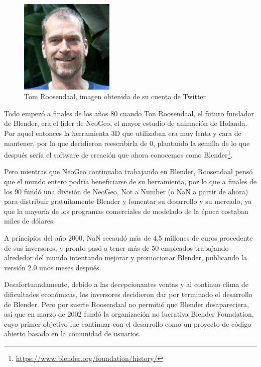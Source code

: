 \begin{figure}[!h]
\begin{center}
\includegraphics[width=0.4\textwidth]{imagenes/2/roosendaal.jpg}
\caption{Tom Roosendaal, imagen obtenida de su cuenta de Twitter}
\label{fig:roosendaal}
\end{center}
\end{figure}

Todo empezó a finales de los años 80 cuando Ton Roosendaal, el futuro fundador de Blender, era el líder de NeoGeo, el mayor estudio de animación de Holanda. Por aquel entonces la herramienta 3D que utilizaban era muy lenta y cara de mantener, por lo que decidieron reescribirla de 0, plantando la semilla de lo que después sería el software de creación que ahora conocemos como Blender\footnote{\url{https://www.blender.org/foundation/history/}}. 

Pero mientras que NeoGeo continuaba trabajando en Blender, Roosendaal pensó que el mundo entero podría beneficiarse de su herramienta, por lo que a finales de los 90 fundó una división de NeoGeo, Not a Number (o NaN a partir de ahora) para distribuir gratuitamente Blender y fomentar su desarrollo y su mercado, ya que la mayoría de los programas comerciales de modelado de la época costaban miles de dólares.

A principios del año 2000, NaN recaudó más de 4,5 millones de euros procedente de sus inversores, y pronto pasó a tener más de 50 empleados trabajando alrededor del mundo intentando mejorar y promocionar Blender, publicando la versión 2.0 unos meses después.

Desafortunadamente, debido a las decepcionantes ventas y al continuo clima de dificultades económicas, los inversores decidieron dar por terminado el desarrollo de Blender. Pero por suerte Roosendaal no permitió que Blender desapareciera, así que en marzo de 2002 fundó la organización no lucrativa Blender Foundation, cuyo primer objetivo fue continuar con el desarrollo como un proyecto de código abierto basado en la comunidad de usuarios.

